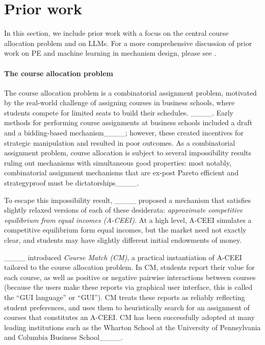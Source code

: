 \section{Prior work}
In this section, we include prior work with a focus on the central course allocation problem and on LLMs. For a more comprehensive discussion of prior work on PE and machine learning in mechanism design, please see .


\paragraph{The course allocation problem}
The course allocation problem is a combinatorial assignment problem, motivated by the real-world challenge of assigning courses in business schools, where students compete for limited seats to build their schedules.
____.
Early methods for performing course assignments at business schools included a draft and a bidding-based mechanism____; however, these created incentives for strategic manipulation and resulted in poor outcomes.
As a combinatorial assignment problem, course allocation is subject to several impossibility results ruling out mechanisms with simultaneous good properties: most notably, combinatorial assignment mechanisms that are ex-post Pareto efficient and strategyproof must be dictatorships____.

To escape this impossibility result, ____ proposed a mechanism that satisfies slightly relaxed versions of each of these desiderata: \textit{approximate competitive equilibrium from equal incomes (A-CEEI)}.
At a high level, A-CEEI simulates a competitive equilibrium form equal incomes, but the market need not exactly clear, and students may have slightly different initial endowments of money.

____ introduced \textit{Course Match (CM)}, a practical instantiation of A-CEEI tailored to the course allocation problem.
In CM, students report their value for each course, as well as positive or negative pairwise interactions between courses (because the users make these reports via graphical user interface, this is called the ``GUI language'' or ``GUI'').
CM treats these reports as reliably reflecting student preferences, and uses them to heuristically search for an assignment of courses that constitutes an A-CEEI.
CM has been successfully adopted at many leading institutions such as the Wharton School at the University of Pennsylvania and Columbia Business School____.


